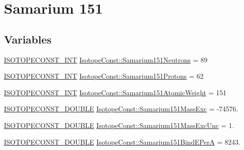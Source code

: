 \hypertarget{group___isotope_const-_samarium-_sm151}{}\section{Samarium 151}
\label{group___isotope_const-_samarium-_sm151}
\subsection*{Variables}
\begin{DoxyCompactItemize}
\item 
\mbox{\hyperlink{group___isotope_const-_macros_ga5f18360b3e99483a35c32d789e62621c}{I\+S\+O\+T\+O\+P\+E\+C\+O\+N\+S\+T\+\_\+\+I\+NT}} \mbox{\hyperlink{group___isotope_const-_samarium-_sm151_gafc863df156bb9fdeb77867c000237894}{Isotope\+Const\+::\+Samarium151\+Neutrons}} = 89
\item 
\mbox{\hyperlink{group___isotope_const-_macros_ga5f18360b3e99483a35c32d789e62621c}{I\+S\+O\+T\+O\+P\+E\+C\+O\+N\+S\+T\+\_\+\+I\+NT}} \mbox{\hyperlink{group___isotope_const-_samarium-_sm151_ga84b78975cd2dab05ebedae838ddc4f6b}{Isotope\+Const\+::\+Samarium151\+Protons}} = 62
\item 
\mbox{\hyperlink{group___isotope_const-_macros_ga5f18360b3e99483a35c32d789e62621c}{I\+S\+O\+T\+O\+P\+E\+C\+O\+N\+S\+T\+\_\+\+I\+NT}} \mbox{\hyperlink{group___isotope_const-_samarium-_sm151_ga951a263a723b6a78b00642eb7eb875c7}{Isotope\+Const\+::\+Samarium151\+Atomic\+Weight}} = 151
\item 
\mbox{\hyperlink{group___isotope_const-_macros_ga8f45a7272ce02c0b4c65c44636ed719a}{I\+S\+O\+T\+O\+P\+E\+C\+O\+N\+S\+T\+\_\+\+D\+O\+U\+B\+LE}} \mbox{\hyperlink{group___isotope_const-_samarium-_sm151_ga2d5f17397b3a7ed2119091b060ae9890}{Isotope\+Const\+::\+Samarium151\+Mass\+Exc}} = -\/74576.
\item 
\mbox{\hyperlink{group___isotope_const-_macros_ga8f45a7272ce02c0b4c65c44636ed719a}{I\+S\+O\+T\+O\+P\+E\+C\+O\+N\+S\+T\+\_\+\+D\+O\+U\+B\+LE}} \mbox{\hyperlink{group___isotope_const-_samarium-_sm151_gab92e7b7fa8eebc848d777293d10fff35}{Isotope\+Const\+::\+Samarium151\+Mass\+Exc\+Unc}} = 1.
\item 
\mbox{\hyperlink{group___isotope_const-_macros_ga8f45a7272ce02c0b4c65c44636ed719a}{I\+S\+O\+T\+O\+P\+E\+C\+O\+N\+S\+T\+\_\+\+D\+O\+U\+B\+LE}} \mbox{\hyperlink{group___isotope_const-_samarium-_sm151_ga0dc70cb0fa2f5c8e627f6a186840d235}{Isotope\+Const\+::\+Samarium151\+Bind\+E\+PerA}} = 8243.
\item 

\end{DoxyCompactItemize}
